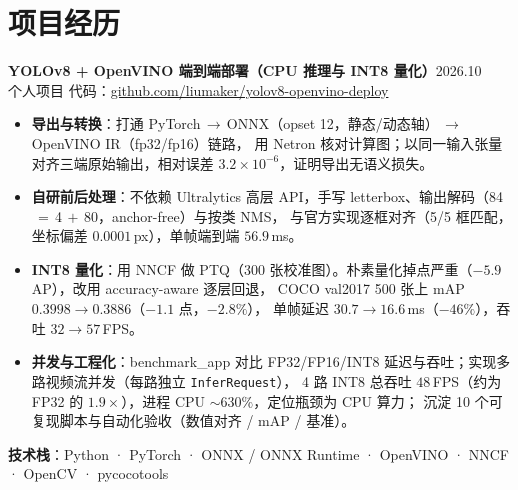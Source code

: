 \documentclass[11pt]{ctexart}
\newcommand{\projecttitle}[2]{%
  \textbf{#1}\hfill{\small #2}\\[2pt]%
}
\begin{document}
\section*{项目经历}

\projecttitle{YOLOv8 + OpenVINO 端到端部署（CPU 推理与 INT8 量化）}{2026.10}
{\small 个人项目 \quad 代码：\href{https://github.com/liumaker/yolov8-openvino-deploy}{github.com/liumaker/yolov8-openvino-deploy}}

\begin{itemize}
  \item \textbf{导出与转换}：打通 PyTorch\,$\rightarrow$\,ONNX（opset 12，静态/动态轴）\,$\rightarrow$\,OpenVINO IR（fp32/fp16）链路，
        用 Netron 核对计算图；以同一输入张量对齐三端原始输出，相对误差 $3.2\times10^{-6}$，证明导出无语义损失。

  \item \textbf{自研前后处理}：不依赖 Ultralytics 高层 API，手写 letterbox、输出解码（84$\,=\,$4$\,+\,$80，anchor-free）与按类 NMS，
        与官方实现逐框对齐（5/5 框匹配，坐标偏差 $0.0001$\,px），单帧端到端 $56.9$\,ms。

  \item \textbf{INT8 量化}：用 NNCF 做 PTQ（300 张校准图）。朴素量化掉点严重（$-5.9$ AP），改用 accuracy-aware 逐层回退，
        COCO val2017 500 张上 mAP $0.3998\rightarrow0.3886$（$-1.1$ 点，$-2.8\%$），
        单帧延迟 $30.7\rightarrow16.6$\,ms（$-46\%$），吞吐 $32\rightarrow57$\,FPS。

  \item \textbf{并发与工程化}：benchmark\_app 对比 FP32/FP16/INT8 延迟与吞吐；实现多路视频流并发（每路独立 \texttt{InferRequest}），
        4 路 INT8 总吞吐 $48$\,FPS（约为 FP32 的 $1.9\times$），进程 CPU $\sim630\%$，定位瓶颈为 CPU 算力；
        沉淀 10 个可复现脚本与自动化验收（数值对齐 / mAP / 基准）。
\end{itemize}

{\small \textbf{技术栈}：Python · PyTorch · ONNX / ONNX Runtime · OpenVINO · NNCF · OpenCV · pycocotools}


%
\end{document}
